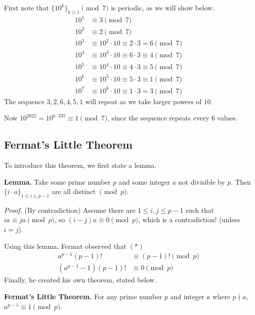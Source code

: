 \documentclass{article}
\begin{document}
    First note that $\{10^{k}\}_{k \ge 1} \pmod{7}$ is periodic, as we will show below.
    \begin{align*}
        10^{1} &\equiv 3 \pmod{7} \\
        10^{2} &\equiv 2 \pmod{7} \\
        10^{3} &\equiv 10^{2} \cdot 10 \equiv 2 \cdot 3 = 6 \pmod{7} \\
        10^{4} &\equiv 10^{3} \cdot 10 \equiv 6 \cdot 3 \equiv 4 \pmod{7} \\
        10^{5} &\equiv 10^{4} \cdot 10 \equiv 4 \cdot 3 \equiv 5 \pmod{7} \\
        10^{6} &\equiv 10^{5} \cdot 10 \equiv 5 \cdot 3 \equiv 1 \pmod{7} \\
        10^{7} &\equiv 10^{6} \cdot 10 \equiv 1 \cdot 3 = 3 \pmod{7}
    \end{align*}
    The sequence $3, 2, 6, 4, 5, 1$ will repeat as we take larger powers of $10$.
    
    \vspace{1.5mm} 
    Now $10^{2022} = 10^{6 \cdot 337} \equiv 1 \pmod{7}$, since the sequence repeats every $6$ values.
    
\subsection*{Fermat's Little Theorem}
    To introduce this theorem, we first state a lemma.
    
    \vspace{1.5mm}
    \textbf{Lemma.} Take some prime number $p$ and some integer $a$ not divisible by $p$. Then $\{i \cdot a\}_{1 \le i \le p - 1}$ are all distinct $\pmod{p}$.
    
    \textit{Proof.} (By contradiction) Assume there are $1 \le i, j \le p - 1$ such that $ia \equiv ja \pmod{p}$, so $(i - j)a \equiv 0 \pmod{p}$, which is a contradiction! (unless $i = j$).
    
    Using this lemma, Fermat observed that $(*)$
    \begin{align*}
        a^{p - 1}(p - 1)! &\equiv (p - 1)! \pmod{p} \\
        (a^{p - 1} - 1)(p - 1)! &\equiv 0 \pmod{p}
    \end{align*}
    Finally, he created his own theorem, stated below.
    
    \vspace{1.5mm}
    \textbf{Fermat's Little Theorem.} For any prime number $p$ and integer $a$ where $p \nmid a$, $a^{p - 1} \equiv 1 \pmod{p}$.
    
\end{document}
